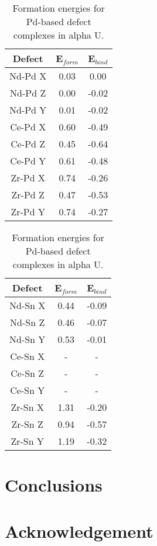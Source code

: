 \documentclass[review]{elsarticle}
\begin{document}
\begin{table}[h!]
\caption{Formation energies for Pd-based defect complexes in alpha U.}
\label{tab:Eforms}
\begin{center}
\begin{tabular}{|c|c|c|}
     \hline
      Defect & E$_{form}$ & E$_{bind}$ \\
     \hline
     Nd-Pd X & 0.03 & 0.00 \\
     Nd-Pd Z & 0.00 & -0.02 \\
     Nd-Pd Y & 0.01 & -0.02 \\
     Ce-Pd X & 0.60 & -0.49 \\
     Ce-Pd Z & 0.45 & -0.64 \\
     Ce-Pd Y & 0.61 & -0.48 \\
     Zr-Pd X & 0.74 & -0.26 \\
     Zr-Pd Z & 0.47 & -0.53\\
     Zr-Pd Y & 0.74 & -0.27 \\     
           \hline
\end{tabular}
\end{center}
\label{default}
\end{table}%

\begin{table}[h!]
\caption{Formation energies for Pd-based defect complexes in alpha U.}
\label{tab:Eforms}
\begin{center}
\begin{tabular}{|c|c|c|}
     \hline
      Defect & E$_{form}$ & E$_{bind}$ \\
     \hline
     Nd-Sn X & 0.44 & -0.09 \\
     Nd-Sn Z & 0.46 & -0.07 \\
     Nd-Sn Y & 0.53 & -0.01 \\
     Ce-Sn X & - & - \\
     Ce-Sn Z & - & - \\
     Ce-Sn Y & - & - \\
     Zr-Sn X & 1.31 & -0.20 \\
     Zr-Sn Z & 0.94 & -0.57 \\
     Zr-Sn Y & 1.19 & -0.32 \\     
           \hline
\end{tabular}
\end{center}
\label{default}
\end{table}%


\FloatBarrier
\section{Conclusions}


\section{Acknowledgement}


\FloatBarrier


\end{document}
